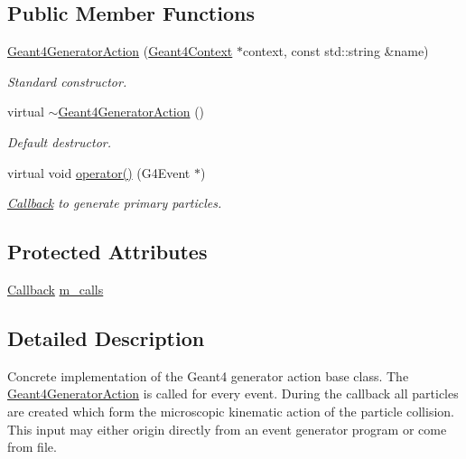 \subsection*{Public Member Functions}
\begin{DoxyCompactItemize}
\item 
\hyperlink{class_d_d4hep_1_1_simulation_1_1_geant4_generator_action_a38bd8b1993559039d35c8eb5c285b7c0}{Geant4GeneratorAction} (\hyperlink{class_d_d4hep_1_1_simulation_1_1_geant4_context}{Geant4Context} $\ast$context, const std::string \&name)
\begin{DoxyCompactList}\small\item\em Standard constructor. \item\end{DoxyCompactList}\item 
virtual \hyperlink{class_d_d4hep_1_1_simulation_1_1_geant4_generator_action_a4b70fe9a48775ddf6853ff699606430d}{$\sim$Geant4GeneratorAction} ()
\begin{DoxyCompactList}\small\item\em Default destructor. \item\end{DoxyCompactList}\item 
virtual void \hyperlink{class_d_d4hep_1_1_simulation_1_1_geant4_generator_action_ac5a1d2335a19e3f9d555081199e01801}{operator()} (G4Event $\ast$)
\begin{DoxyCompactList}\small\item\em \hyperlink{class_d_d4hep_1_1_callback}{Callback} to generate primary particles. \item\end{DoxyCompactList}\end{DoxyCompactItemize}
\subsection*{Protected Attributes}
\begin{DoxyCompactItemize}
\item 
\hyperlink{class_d_d4hep_1_1_callback}{Callback} \hyperlink{class_d_d4hep_1_1_simulation_1_1_geant4_generator_action_aa0b8787cbdd5dfefc992aac6dd1073c3}{m\_\-calls}
\end{DoxyCompactItemize}


\subsection{Detailed Description}
Concrete implementation of the Geant4 generator action base class. The \hyperlink{class_d_d4hep_1_1_simulation_1_1_geant4_generator_action}{Geant4GeneratorAction} is called for every event. During the callback all particles are created which form the microscopic kinematic action of the particle collision. This input may either origin directly from an event generator program or come from file.

